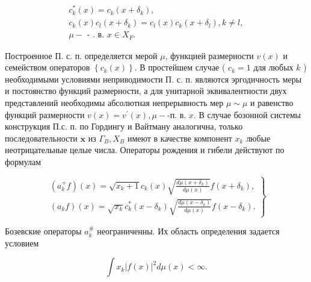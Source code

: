 \documentclass[10pt]{article}
\begin{document}
\[

\begin{gathered}

c_{k}^{*}(x)=c_{k}\left(x+\delta_{k}\right), \\

c_{k}(x) c_{l}\left(x+\delta_{k}\right)=c_{l}(x) c_{k}\left(x+\delta_{l}\right), k \neq l, \\

\mu-\text { - . в. } x \in X_{F} .

\end{gathered}

\]



Построенное П. с. п. определяется мерой $\mu$, функцией размерности $v(x)$ и семейством операторов $\left\{c_{k}(x)\right\}$. В простейшем случае ( $c_{k}=1$ для любых $k$ ) необходимыми условиями неприводимости П. с. п. являются эргодичность меры и постоянство функций размерности, а для унитарной эквивалентности двух представлений необходимы абсолютная непрерывность мер $\mu \sim \mu$ и равенство функций размерности $v(x)=v^{\prime}(x), \mu-$-п. в. $x$. В случае бозонной системы конструкция П.с. п. по Гордингу и Вайтману аналогична, только последовательности $\boldsymbol{x}$ из $\Gamma_{B}, X_{B}$ имеют в качестве компонент $x_{k}$ любые неотрицательные целые числа. Операторы рождения и гибели действуют по формулам



\[

\left.\begin{array}{l}

\left(a_{k}^{+} f\right)(x)=\sqrt{x_{k}+1} c_{k}(x) \sqrt{\frac{d \mu\left(x+\delta_{k}\right)}{d \mu(x)}} f\left(x+\delta_{k}\right), \\

\left(a_{k} f\right)(x)=\sqrt{x_{k}} c_{k}^{*}\left(x-\delta_{k}\right) \sqrt{\frac{d \mu\left(x-\delta_{k}\right)}{d \mu(x)}} f\left(x-\delta_{k}\right) .

\end{array}\right\}

\]



Бозевские операторы $a_{k}^{\#}$ неограниченны. Их область определения задается условием



\[

\int x_{k}|f(x)|^{2} d \mu(x)<\infty .

\]
\end{document}
